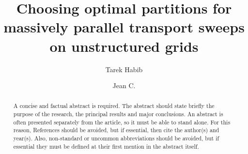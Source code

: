 \documentclass[times,final]{elsarticle}
\begin{document}


\begin{frontmatter}

\title{Choosing optimal partitions for massively parallel transport sweeps on unstructured grids}%

\author[1]{Tarek Habib }%
\author[1]{Jean C. }

\address[1]{Department of Nuclear Engineering, Texas A\&M University, College Station, TX 77843, USA}



\begin{abstract}
A concise and factual abstract is required. The abstract should state briefly the purpose of the research, the principal results and major conclusions. An abstract is often presented separately from the article, so it must be able to stand alone. For this reason, References should be avoided, but if essential, then cite the author(s) and year(s). Also, non-standard or uncommon abbreviations should be avoided, but if essential they must be defined at their first mention in the abstract itself.
\end{abstract}


\end{frontmatter}


\end{document}
